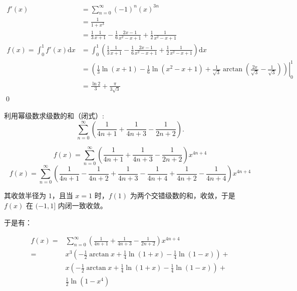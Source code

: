 \begin{align*}
	f'( x) & =\sum _{n=0}^{\infty } (-1)^{n} (x)^{3n}\\
	& =\frac{1}{1+x^{3}}\\
	& =\frac{1}{3}\frac{1}{x+1} -\frac{1}{6}\frac{2x-1}{x^{2} -x+1} +\frac{1}{2}\frac{1}{x^{2} -x+1}\\
	f( x) =\int _{0}^{1} f'( x)\mathrm{d} x & =\int _{0}^{1}\left(\frac{1}{3}\frac{1}{x+1} -\frac{1}{6}\frac{2x-1}{x^{2} -x+1} +\frac{1}{2}\frac{1}{x^{2} -x+1}\right)\mathrm{d} x\\
	& =\left. \left(\frac{1}{3}\ln( x+1) -\frac{1}{6}\ln\left( x^{2} -x+1\right) +\frac{1}{\sqrt{3}}\arctan\left(\frac{2x}{\sqrt{3}} -\frac{1}{\sqrt{3}}\right)\right)\right| _{0}^{1}\\
	& =\frac{\ln 2}{3} +\frac{\pi }{3\sqrt{3}}
\end{align*}
\qed 







\begin{ques}
利用幂级数求级数的和（闭式）:
\begin{equation*}
	\sum _{n=0}^{\infty }\left(\frac{1}{4n+1} +\frac{1}{4n+3} -\frac{1}{2n+2}\right) .
\end{equation*}
\end{ques}


\begin{equation}f( x) =\sum _{n=0}^{\infty }\left(\frac{1}{4n+1} +\frac{1}{4n+3} -\frac{1}{2n+2}\right)x^{4n+4}\end{equation}
\begin{equation}f( x) =\sum _{n=0}^{\infty }\left(\frac{1}{4n+1} -\frac{1}{4n+2} +\frac{1}{4n+3} -\frac{1}{4n+4}+\frac{1}{4n+2} -\frac{1}{4n+4}\right)x^{4n+4}\end{equation}

其收敛半径为 $1$，且当 $x=1$ 时，$f(1)$ 为两个交错级数的和，收敛，于是 $f(x)$ 在 $(-1,1]$ 内闭一致收敛。

于是有：

$$
\begin{aligned}
	f( x) =&\sum _{n=0}^{\infty }\left(\frac{1}{4n+1} +\frac{1}{4n+3} -\frac{1}{2n+2}\right)x^{4n+4}\\
	=&x^3\left(-\frac{1}{2}\arctan x +\frac{1}{4}\ln(1+x)-\frac{1}{4}\ln(1-x)\right)+\\
	&x\left(-\frac{1}{2}\arctan x + \frac{1}{4}\ln(1+x)-\frac{1}{4}\ln(1-x)\right)+\\
	&\frac{1}{2}\ln(1-x^4)
\end{aligned}
$$

